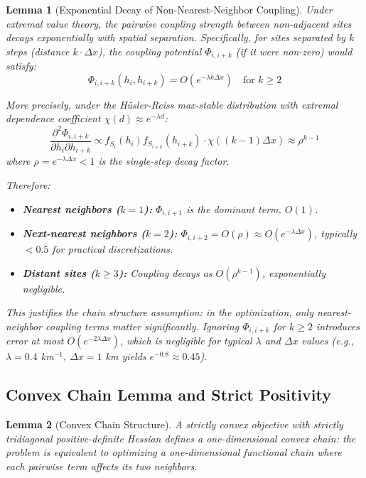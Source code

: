 \documentclass[12pt]{article}
\newtheorem{lemma}{Lemma}[section]
\theoremstyle{definition}
\begin{document}
\begin{lemma}[Exponential Decay of Non-Nearest-Neighbor Coupling]
\label{lem:exponential_decay}
Under extremal value theory, the pairwise coupling strength between non-adjacent sites decays exponentially with spatial separation. Specifically, for sites separated by $k$ steps (distance $k \cdot \Delta x$), the coupling potential $\Phi_{i,i+k}$ (if it were non-zero) would satisfy:
\[
\Phi_{i,i+k}(h_i, h_{i+k}) = O\left(e^{-\lambda k \Delta x}\right) \quad \text{for } k \geq 2
\]

More precisely, under the Hüsler-Reiss max-stable distribution with extremal dependence coefficient $\chi(d) \approx e^{-\lambda d}$:
\[
\frac{\partial^2 \Phi_{i,i+k}}{\partial h_i \partial h_{i+k}} \propto f_{S_i}(h_i) f_{S_{i+k}}(h_{i+k}) \cdot \chi\left( (k-1) \Delta x \right) \approx \rho^{k-1}
\]
where $\rho = e^{-\lambda \Delta x} < 1$ is the single-step decay factor.

Therefore:
\begin{itemize}
    \item \textbf{Nearest neighbors ($k=1$):} $\Phi_{i,i+1}$ is the dominant term, $O(1)$.
    \item \textbf{Next-nearest neighbors ($k=2$):} $\Phi_{i,i+2} = O(\rho) \approx O(e^{-\lambda \Delta x})$, typically $< 0.5$ for practical discretizations.
    \item \textbf{Distant sites ($k \geq 3$):} Coupling decays as $O(\rho^{k-1})$, exponentially negligible.
\end{itemize}

This justifies the \emph{chain structure} assumption: in the optimization, only nearest-neighbor coupling terms matter significantly. Ignoring $\Phi_{i,i+k}$ for $k \geq 2$ introduces error at most $O(e^{-2\lambda \Delta x})$, which is negligible for typical $\lambda$ and $\Delta x$ values (e.g., $\lambda=0.4$ km$^{-1}$, $\Delta x = 1$ km yields $e^{-0.8} \approx 0.45$).
\end{lemma}

\subsection{Convex Chain Lemma and Strict Positivity}

\begin{lemma}[Convex Chain Structure]
A strictly convex objective with strictly tridiagonal positive-definite Hessian defines a \emph{one-dimensional convex chain}: the problem is equivalent to optimizing a one-dimensional functional chain where each pairwise term affects its two neighbors.
\end{lemma}
\end{document}

